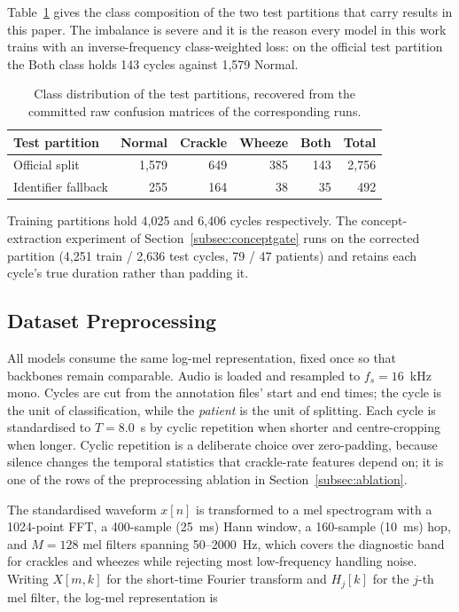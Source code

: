 \documentclass[journal,onecolumn]{IEEEtran}
\begin{document}
Table~\ref{tab:classdist} gives the class composition of the two test partitions that
carry results in this paper. The imbalance is severe and it is the reason every model
in this work trains with an inverse-frequency class-weighted loss: on the official
test partition the Both class holds 143 cycles against 1{,}579 Normal.

\begin{table}[!t]
\centering
\caption{Class distribution of the test partitions, recovered from the committed raw
confusion matrices of the corresponding runs.}
\label{tab:classdist}
\begin{tabular}{lrrrrr}
\toprule
Test partition & Normal & Crackle & Wheeze & Both & Total \\
\midrule
Official split & 1{,}579 & 649 & 385 & 143 & 2{,}756 \\
Identifier fallback & 255 & 164 & 38 & 35 & 492 \\
\bottomrule
\end{tabular}

\vspace{2pt}
\footnotesize Training partitions hold 4{,}025 and 6{,}406 cycles respectively. The
concept-extraction experiment of Section~\ref{subsec:conceptgate} runs on the
corrected partition (4{,}251 train / 2{,}636 test cycles, 79 / 47 patients) and
retains each cycle's true duration rather than padding it.
\end{table}

\subsection{Dataset Preprocessing}
\label{subsec:preprocessing}

All models consume the same log-mel representation, fixed once so that backbones
remain comparable. Audio is loaded and resampled to $f_s = 16$~kHz mono. Cycles are
cut from the annotation files' start and end times; the cycle is the unit of
classification, while the \emph{patient} is the unit of splitting. Each cycle is
standardised to $T = 8.0$~s by cyclic repetition when shorter and centre-cropping
when longer. Cyclic repetition is a deliberate choice over zero-padding, because
silence changes the temporal statistics that crackle-rate features depend on; it is
one of the rows of the preprocessing ablation in Section~\ref{subsec:ablation}.

The standardised waveform $x[n]$ is transformed to a mel spectrogram with a
1024-point FFT, a 400-sample (25~ms) Hann window, a 160-sample (10~ms) hop, and $M =
128$ mel filters spanning 50--2000~Hz, which covers the diagnostic band for crackles
and wheezes while rejecting most low-frequency handling noise. Writing $X[m,k]$ for
the short-time Fourier transform and $H_j[k]$ for the $j$-th mel filter, the log-mel
representation is
\end{document}
